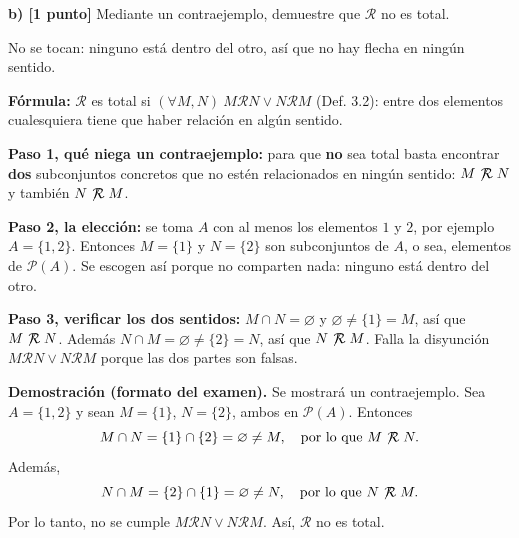 \documentclass[11pt]{article}
\newcommand{\R}{\mathcal{R}}
\newcommand{\nR}{\mathrel{\not\!\mathcal{R}}}
\newcommand{\hl}[1]{\colorbox{green!35}{#1}}
\begin{document}
\textbf{b) [1 punto]} Mediante un \hl{contraejemplo}, demuestre que $\R$ \hl{no es total}.

\begin{center}

{\small No se tocan: ninguno está dentro del otro, así que no hay flecha en ningún sentido.}
\end{center}


\begin{explica}
\textbf{Fórmula:} $\R$ es total si $(\forall M,N)\ M\R N\vee N\R M$ (Def. 3.2): entre dos elementos cualesquiera tiene que haber relación en algún sentido.

\textbf{Paso 1, qué niega un contraejemplo:} para que \textbf{no} sea total basta encontrar \textbf{dos} subconjuntos concretos que no estén relacionados en ningún sentido: $M\nR N$ y también $N\nR M$.

\textbf{Paso 2, la elección:} se toma $A$ con al menos los elementos $1$ y $2$, por ejemplo $A=\{1,2\}$. Entonces $M=\{1\}$ y $N=\{2\}$ son subconjuntos de $A$, o sea, elementos de $\mathcal P(A)$. Se escogen así porque no comparten nada: ninguno está dentro del otro.

\textbf{Paso 3, verificar los dos sentidos:} $M\cap N=\varnothing$ y $\varnothing\neq\{1\}=M$, así que $M\nR N$. Además $N\cap M=\varnothing\neq\{2\}=N$, así que $N\nR M$. Falla la disyunción $M\R N\vee N\R M$ porque las dos partes son falsas.
\end{explica}

\textbf{Demostración (formato del examen).} Se mostrará un contraejemplo. Sea $A=\{1,2\}$ y sean $M=\{1\}$, $N=\{2\}$, ambos en $\mathcal P(A)$. Entonces
\[
M\cap N=\{1\}\cap\{2\}=\varnothing\neq M,\quad\text{por lo que } M\nR N.
\]
Además,
\[
N\cap M=\{2\}\cap\{1\}=\varnothing\neq N,\quad\text{por lo que } N\nR M.
\]
Por lo tanto, no se cumple $M\R N\vee N\R M$. Así, $\R$ no es total.
\end{document}
